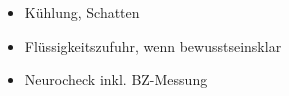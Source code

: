 
\begin{itemize}
  \item Kühlung, Schatten
  \item Flüssigkeitszufuhr, wenn bewusstseinsklar
  \item Neurocheck inkl. BZ-Messung
\end{itemize}